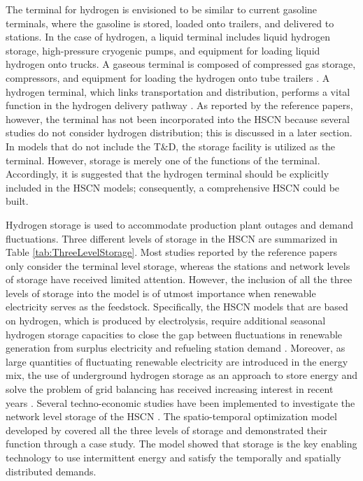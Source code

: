 \documentclass[11pt,3p]{elsarticle}
\begin{document}
The terminal for hydrogen is envisioned to be similar to current gasoline terminals, where the gasoline is stored, loaded onto trailers, and delivered to stations. In the case of hydrogen, a liquid terminal includes liquid hydrogen storage, high-pressure cryogenic pumps, and equipment for loading liquid hydrogen onto trucks. A gaseous terminal is composed of compressed gas storage, compressors, and equipment for loading the hydrogen onto tube trailers \citep{ringer2006h2a}. A hydrogen terminal, which links transportation and distribution, performs a vital function in the hydrogen delivery pathway \citep{elgowainy2015h2a}. As reported by the reference papers, however, the terminal has not been incorporated into the HSCN because several studies do not consider hydrogen distribution; this is discussed in a later section. In models that do not include the T\&D, the storage facility is utilized as the terminal. However, storage is merely one of the functions of the terminal. Accordingly, it is suggested that the hydrogen terminal should be explicitly included in the HSCN models; consequently, a comprehensive HSCN could be built.

Hydrogen storage is used to accommodate production plant outages and demand fluctuations. Three different levels of storage in the HSCN are summarized in Table \ref{tab:ThreeLevelStorage}. Most studies reported by the reference papers only consider the terminal level storage, whereas the stations and network levels of storage have received limited attention. However, the inclusion of all the three levels of storage into the model is of utmost importance when renewable electricity serves as the feedstock. Specifically, the HSCN models that are based on hydrogen, which is produced by electrolysis, require additional seasonal hydrogen storage capacities to close the gap between fluctuations in renewable generation from surplus electricity and refueling station demand \citep{reuss2017seasonal}. Moreover, as large quantities of fluctuating renewable electricity are introduced in the energy mix, the use of underground hydrogen storage as an approach to store energy and solve the problem of grid balancing has received increasing interest in recent years \citep{hyunder}. Several techno-economic studies have been implemented to investigate the network level storage of the HSCN \citep{ringer2006h2a,elgowainy2015h2a,le2017relevance,reuss2017seasonal}. The spatio-temporal optimization model developed by \citet{samsatli2016optimal} covered all the three levels of storage and demonstrated their function through a case study. The model showed that storage is the key enabling technology to use intermittent energy and satisfy the temporally and spatially distributed demands.
\end{document}
